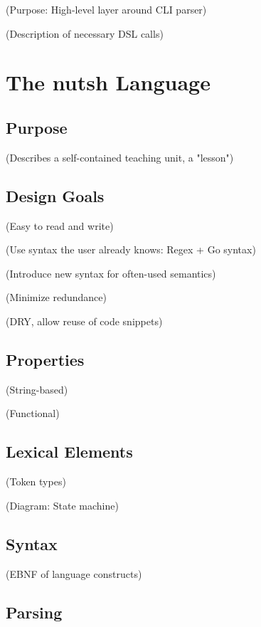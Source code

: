 \documentclass[twoside]{scrreprt}
\begin{document}
    (Purpose: High-level layer around CLI parser)

    (Description of necessary DSL calls)

\chapter{The nutsh Language}

\section{Purpose}

        (Describes a self-contained teaching unit, a "lesson")

\section{Design Goals}

        (Easy to read and write)

            (Use syntax the user already knows: Regex + Go syntax)

            (Introduce new syntax for often-used semantics)

        (Minimize redundance)

            (DRY, allow reuse of code snippets)

\section{Properties}

        (String-based)

        (Functional)

\section{Lexical Elements}

        (Token types)

        (Diagram: State machine)

\section{Syntax}

        (EBNF of language constructs)

\section{Parsing}
\end{document}

